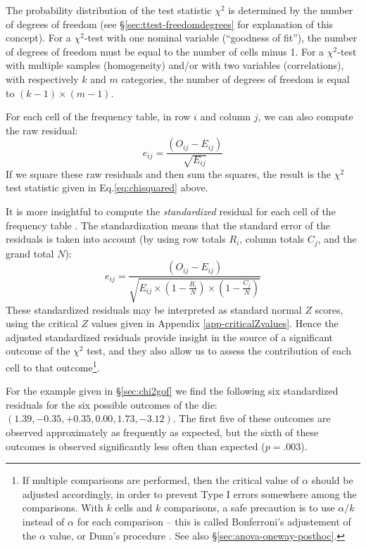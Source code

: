 \documentclass[
]{book}
\begin{document}
The probability distribution of the test statistic \(\chi^2\) is determined by the number of degrees of freedom (see §\ref{sec:ttest-freedomdegrees} for explanation of this concept).
For a \(\chi^2\)-test with one nominal variable (``goodness of fit''), the number of degrees of freedom must be equal to the number of cells minus 1. For a \(\chi^2\)-test with multiple samples (homogeneity) and/or with two variables (correlations), with respectively \(k\) and \(m\) categories, the number of degrees of freedom is equal to \((k-1)\times(m-1)\).

For each cell of the frequency table, in row \(i\) and column \(j\), we can also compute the raw residual:
\begin{equation}
  \label{eq:chi2-rawresidu}
  e_{ij} = \frac{(O_{ij}-E_{ij})}{\sqrt{E_{ij}}}
\end{equation}
If we square these raw residuals and then sum the squares, the result is the \(\chi^2\) test statistic given in Eq.\eqref{eq:chisquared} above.

It is more insightful to compute the \emph{standardized} residual for each cell of the frequency table \citep[p.38]{Agre07}. The standardization means that the standard error of the residuals is taken into account (by using row totals \(R_i\), column totals \(C_j\), and the grand total \(N\)):
\begin{equation}
  \label{eq:chi2-stdresidu}
  e_{ij} = \frac{(O_{ij}-E_{ij})}{\sqrt{E_{ij}\times(1-\frac{R_i}{N})\times(1-\frac{C_j}{N})}}
\end{equation}
These standardized residuals may be interpreted as standard normal \(Z\) scores, using the critical \(Z\) values given in Appendix \ref{app-criticalZvalues}. Hence the adjusted standardized residuals provide insight in the source of a significant outcome of the \(\chi^2\) test, and they also allow us to assess the contribution of each cell to that outcome\footnote{If multiple comparisons are performed, then the critical value of \(\alpha\) should be adjusted accordingly, in order to prevent Type I errors somewhere among the comparisons. With \(k\) cells and \(k\) comparisons, a safe precaution is to use \(\alpha/k\) instead of \(\alpha\) for each comparison -- this is called Bonferroni's adjustement of the \(\alpha\) value, or Dunn's procedure \citep[p.202]{MD04}. See also §\ref{sec:anova-oneway-posthoc}.}.

For the example given in §\ref{sec:chi2gof} we find the following six standardized residuals for the six possible outcomes of the die: \((1.39, -0.35, +0.35, 0.00, 1.73, -3.12)\). The first five of these outcomes are observed approximately as frequently as expected, but the sixth of these outcomes is observed significantly less often than expected (\(p=.003\)).
\end{document}
